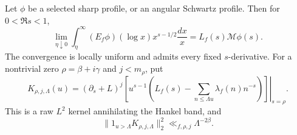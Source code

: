 \begin{proposition}
\label{hnew:sharp-mellin}
Let $\phi$ be a selected sharp profile, or an angular Schwartz
profile.  Then for $0<\Re s<1$,
\begin{equation}\label{hnew:improper}
 \lim_{\eta\downarrow0}
 \int_\eta^\infty (E_f\phi)(\log x)x^{s-1/2}\frac{dx}{x}
                =L_f(s)\mathcal M\phi(s).
\end{equation}
The convergence is locally uniform and admits every fixed
$s$-derivative.  For a nontrivial zero $\rho=\beta+i\gamma$ and
$j<m_\rho$, put
\begin{equation}\label{hnew:jet-kernel}
 K_{\rho,j,\Lambda}(u)=
 \left.(\partial_s+L)^j\left[
 u^{s-1}\left(L_f(s)-\sum_{n\le\Lambda u}\lambda_f(n)n^{-s}\right)
                         \right]\right|_{s=\rho}.
\end{equation}
This is a raw $L^2$ kernel annihilating the Hankel band, and
\begin{equation}\label{hnew:jet-exterior}
 \|1_{u>\Lambda}K_{\rho,j,\Lambda}\|_2^2
                           \ll_{f,\rho,j}\Lambda^{-2\beta}.
\end{equation}
\end{proposition}
